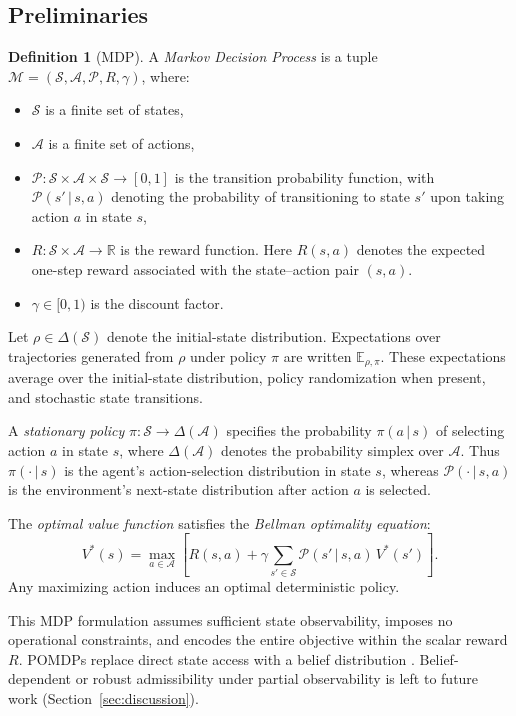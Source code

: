 \documentclass[journal]{IEEEtran}
\theoremstyle{definition}
\newtheorem{definition}{Definition}[section]
\newcommand{\cS}{\mathcal{S}}
\newcommand{\cA}{\mathcal{A}}
\newcommand{\cP}{\mathcal{P}}
\newcommand{\cM}{\mathcal{M}}
\newcommand{\E}{\mathbb{E}}
\newcommand{\R}{\mathbb{R}}
\newcommand{\given}{\,\vert\,}
\begin{document}
\subsection{Preliminaries}
\label{subsec:prelim}

\begin{definition}[MDP]
A \emph{Markov Decision Process} is a tuple
$\cM = (\cS, \cA, \cP, R, \gamma)$, where:
\begin{itemize}
  \item $\cS$ is a finite set of states,
  \item $\cA$ is a finite set of actions,
  \item $\cP : \cS \times \cA \times \cS \to [0,1]$ is the transition
  probability function, with $\cP(s' \given s, a)$ denoting the probability
  of transitioning to state $s'$ upon taking action $a$ in state $s$,
  \item $R : \cS \times \cA \to \R$ is the reward function. Here
  $R(s,a)$ denotes the expected one-step reward
  associated with the state--action pair $(s,a)$.
  \item $\gamma \in [0,1)$ is the discount factor.
\end{itemize}
\end{definition}

Let $\rho\in\Delta(\cS)$ denote the initial-state distribution. Expectations
over trajectories generated from $\rho$ under policy $\pi$ are written
$\E_{\rho,\pi}$. These expectations average over the initial-state
distribution, policy randomization when present, and stochastic state
transitions.

A \emph{stationary policy} $\pi : \cS \to \Delta(\cA)$ specifies the
probability $\pi(a \given s)$ of selecting action $a$ in state $s$, where
$\Delta(\cA)$ denotes the probability simplex over $\cA$.
Thus $\pi(\cdot\given s)$ is the agent's action-selection distribution
in state $s$, whereas $\cP(\cdot\given s,a)$ is the environment's next-state
distribution after action $a$ is selected.

The \emph{optimal value function} satisfies the \emph{Bellman optimality
equation}:
\begin{equation}
  V^*(s) = \max_{a \in \cA}\!\left[R(s,a) + \gamma
    \sum_{s' \in \cS} \cP(s' \given s, a)\, V^*(s')\right].
  \label{eq:bellman}
\end{equation}
Any maximizing action induces an optimal deterministic policy.

This MDP formulation assumes sufficient state observability, imposes no
operational constraints, and encodes the entire objective within the scalar
reward $R$. POMDPs replace direct state access with a belief distribution
\citep{kaelbling1998}. Belief-dependent or robust admissibility under partial
observability is left to future work (Section~\ref{sec:discussion}).
\end{document}
